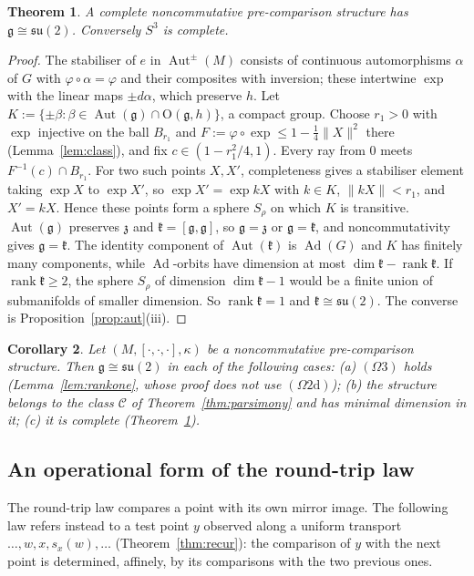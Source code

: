 \documentclass[11pt,reqno]{amsart}
\newtheorem{theorem}{Theorem}[section]
\newtheorem{corollary}[theorem]{Corollary}
\theoremstyle{definition}
\theoremstyle{remark}
\numberwithin{equation}{section}
\newcommand{\g}{\mathfrak{g}}
\newcommand{\z}{\mathfrak{z}}
\newcommand{\kk}{\mathfrak{k}}
\newcommand{\su}{\mathfrak{su}}
\newcommand{\Aut}{\operatorname{Aut}}
\newcommand{\Ad}{\operatorname{Ad}}
\newcommand{\rk}{\operatorname{rank}}
\newcommand{\hp}[3]{[#1,#2,#3]}
\newcommand{\OO}{\mathrm{O}}
\begin{document}
\begin{theorem}\label{thm:cc}
A complete noncommutative pre-comparison structure has $\g\cong\su(2)$.  Conversely $S^3$ is complete.
\end{theorem}
\begin{proof}
The stabiliser of $e$ in $\Aut^\pm(M)$ consists of continuous automorphisms $\alpha$ of $G$ with
$\varphi\circ\alpha=\varphi$ and their composites with inversion; these intertwine $\exp$ with the linear
maps $\pm d\alpha$, which preserve $h$.  Let $K:=\{\pm\beta:\beta\in\Aut(\g)\cap\OO(\g,h)\}$, a compact
group.  Choose $r_1>0$ with $\exp$ injective on the ball $B_{r_1}$ and $F:=\varphi\circ\exp\le1-\tfrac14\lVert
X\rVert^2$ there (Lemma~\ref{lem:class}), and fix $c\in(1-r_1^2/4,1)$.  Every ray from $0$ meets
$F^{-1}(c)\cap B_{r_1}$.  For two such points $X,X'$, completeness gives a stabiliser element taking $\exp X$
to $\exp X'$, so $\exp X'=\exp kX$ with $k\in K$, $\lVert kX\rVert<r_1$, and $X'=kX$.  Hence these points form
a sphere $S_\rho$ on which $K$ is transitive.  $\Aut(\g)$ preserves $\z$ and $\kk=[\g,\g]$, so
$\g=\z$ or $\g=\kk$, and noncommutativity gives $\g=\kk$.  The identity component of $\Aut(\kk)$ is
$\Ad(G)$ and $K$ has finitely many components, while $\Ad$-orbits have dimension at most
$\dim\kk-\rk\kk$.  If $\rk\kk\ge2$, the sphere $S_\rho$ of dimension $\dim\kk-1$ would be a finite union
of submanifolds of smaller dimension.  So $\rk\kk=1$ and $\kk\cong\su(2)$.  The converse is
Proposition~\ref{prop:aut}(iii).
\end{proof}

\begin{corollary}
Let $(M,\hp\cdot\cdot\cdot,\kappa)$ be a noncommutative pre-comparison structure.  Then $\g\cong\su(2)$ in each of the
following cases: (a) $(\Omega3)$ holds (Lemma~\ref{lem:rankone}, whose proof does not use $(\Omega2\mathrm d)$);
(b) the structure belongs to the class $\mathcal C$ of Theorem~\ref{thm:parsimony} and has minimal dimension in it;
(c) it is complete (Theorem~\ref{thm:cc}).
\end{corollary}

\subsection{An operational form of the round-trip law}\label{sec:operational}
The round-trip law compares a point with its own mirror image.  The following law refers instead to a test
point $y$ observed along a uniform transport $\dots,w,x,s_x(w),\dots$ (Theorem~\ref{thm:recur}): the comparison of
$y$ with the next point is determined, affinely, by its comparisons with the two previous ones.
\end{document}

